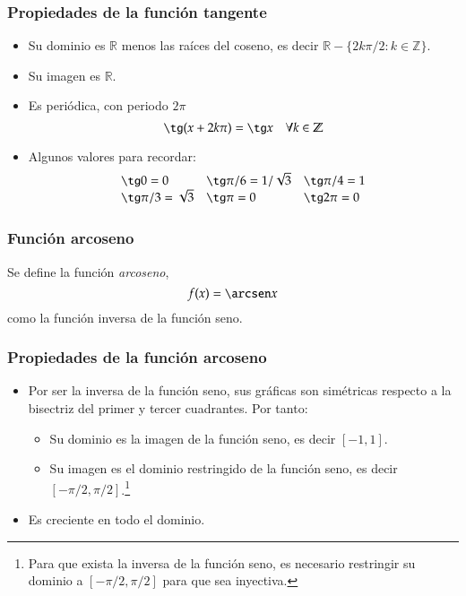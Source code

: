 \begin{frame}
\frametitle{Propiedades de la función tangente}
\begin{itemize}
\item Su dominio es $\mathbb{R}$ menos las raíces del coseno, es decir $\mathbb{R}-\{2k\pi/2: k\in \mathbb{Z}\}$.
\item Su imagen es $\mathbb{R}$.
\item Es periódica, con periodo $2\pi$
\[\tg (x+2k\pi)= \tg x\quad \forall k\in \mathbb{Z}\]
\item Algunos valores para recordar:
\[
\begin{array}{lll}
\tg 0=0 & \tg \pi/6= 1/\sqrt{3} & \tg \pi/4=1 \\
\tg \pi/3= \sqrt{3} & \tg \pi =0 & \tg 2\pi=0
\end{array}
\]
\end{itemize}
\end{frame} 


\begin{frame}
\frametitle{Función arcoseno}
\begin{definicion}
Se define la función \emph{arcoseno},
\[f(x)=\arcsen x\]
como la función inversa de la función seno.
\end{definicion}
\begin{center}
\scalebox{1}{}
\end{center}
\end{frame} 



\begin{frame}
\frametitle{Propiedades de la función arcoseno}
\begin{itemize}
\item Por ser la inversa de la función seno, sus gráficas son simétricas respecto a la bisectriz del primer y tercer
cuadrantes. Por tanto:
\begin{itemize}
\item Su dominio es la imagen de la función seno, es decir $[-1,1]$.
\item Su imagen es el dominio restringido de la función seno, es decir $[-\pi/2,\pi/2]$.\footnote{Para que exista la
inversa de la función seno, es necesario restringir su dominio a $[-\pi/2,\pi/2]$ para que sea inyectiva.}
\end{itemize}
\item Es creciente en todo el dominio.
\end{itemize}
\end{frame} 



